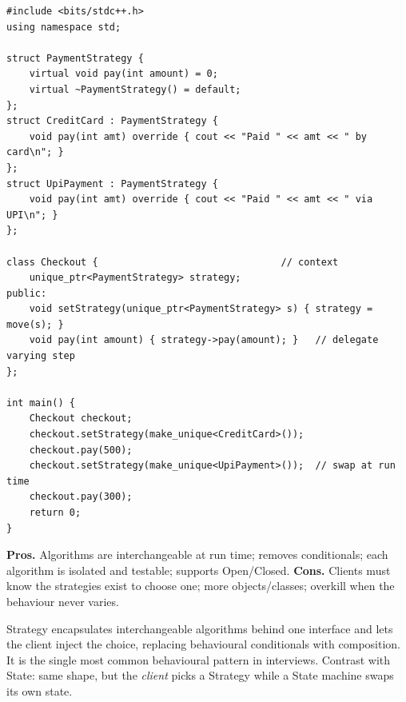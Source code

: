 \begin{lstlisting}
#include <bits/stdc++.h>
using namespace std;

struct PaymentStrategy {
    virtual void pay(int amount) = 0;
    virtual ~PaymentStrategy() = default;
};
struct CreditCard : PaymentStrategy {
    void pay(int amt) override { cout << "Paid " << amt << " by card\n"; }
};
struct UpiPayment : PaymentStrategy {
    void pay(int amt) override { cout << "Paid " << amt << " via UPI\n"; }
};

class Checkout {                                // context
    unique_ptr<PaymentStrategy> strategy;
public:
    void setStrategy(unique_ptr<PaymentStrategy> s) { strategy = move(s); }
    void pay(int amount) { strategy->pay(amount); }   // delegate varying step
};

int main() {
    Checkout checkout;
    checkout.setStrategy(make_unique<CreditCard>());
    checkout.pay(500);
    checkout.setStrategy(make_unique<UpiPayment>());  // swap at run time
    checkout.pay(300);
    return 0;
}
\end{lstlisting}

\begin{complexitybox}
\textbf{Pros.} Algorithms are interchangeable at run time; removes
conditionals; each algorithm is isolated and testable; supports
Open/Closed. \textbf{Cons.} Clients must know the strategies exist to
choose one; more objects/classes; overkill when the behaviour never varies.
\end{complexitybox}

\begin{takeawaybox}
Strategy encapsulates interchangeable algorithms behind one interface and
lets the client inject the choice, replacing behavioural conditionals with
composition. It is the single most common behavioural pattern in
interviews. Contrast with State: same shape, but the \emph{client} picks a
Strategy while a State machine swaps its own state.
\end{takeawaybox}
